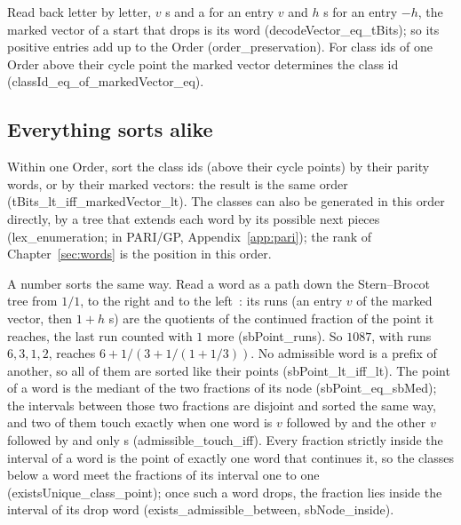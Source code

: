 \documentclass[10pt,a4paper,titlepage]{article}
\newcommand{\lean}[1]{\textsf{#1}}
\begin{document}
\nopagebreak
Read back letter by letter, $v$ s and a  for an entry $v$ and $h$
s for an entry $-h$, the marked vector of a start that drops is its word
(\lean{decodeVector\_eq\_tBits}); so its positive entries add up to the Order
(\lean{order\_preservation}). For class ids of one Order above their
cycle point the marked vector determines the class id
(\lean{classId\_eq\_of\_markedVector\_eq}).

\subsection*{Everything sorts alike}
\label{sec:sorting}

Within one Order, sort the class ids (above their cycle points) by their parity
words, or by their marked vectors: the result is the same order
(\lean{tBits\_lt\_iff\_markedVector\_lt}).
The classes can also be generated in this order directly, by a tree that
extends each word by its possible next pieces (\lean{lex\_enumeration}; in PARI/GP,
Appendix~\ref{app:pari}); the
rank of Chapter~\ref{sec:words} is the position in this order.

\nopagebreak
A number sorts the same way. Read a word as a path down the Stern--Brocot tree from $1/1$,
 to the right and  to the left~\cite{Ryde2020}: its runs (an entry $v$ of the marked
vector, then $1 + h$ s) are the quotients of the continued fraction of the point it
reaches, the last run counted with $1$ more (\lean{sbPoint\_runs}). So $1087$, with runs
$6, 3, 1, 2$, reaches $6 + 1/(3 + 1/(1 + 1/3))$. No admissible word is a prefix of another, so
all of them are sorted like their points (\lean{sbPoint\_lt\_iff\_lt}). The point of a word is
the mediant of the two fractions of its node (\lean{sbPoint\_eq\_sbMed}); the intervals between
those two fractions are disjoint and sorted the same way, and two of them touch exactly when
one word is $v$ followed by  and the other $v$ followed by  and only s
(\lean{admissible\_touch\_iff}). Every fraction strictly inside the interval of a word is
the point of exactly one word that continues it, so the classes below a word meet the
fractions of its interval one to one (\lean{existsUnique\_class\_point}); once such a word
drops, the fraction lies inside the interval of its drop word
(\lean{exists\_admissible\_between}, \lean{sbNode\_inside}).
\end{document}
